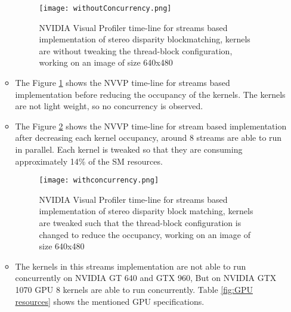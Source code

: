 \begin{itemize}
\begin{itemize}
		\begin{figure}[htb]
			\centering
			\texttt{[image: withoutConcurrency.png]}
			\caption{NVIDIA Visual Profiler time-line for streams based implementation of stereo disparity blockmatching, kernels are without tweaking the thread-block configuration, working on an image of size 640x480}
			\label{fig:full occupancy}
		\end{figure}
		\item The Figure \ref{fig:full occupancy} shows the NVVP time-line for streams based implementation before reducing the occupancy of the kernels. The kernels are not light weight, so no concurrency is observed.
		\item The Figure \ref{fig:reduced occupancy} shows the NVVP time-line for stream based implementation after decreasing each kernel occupancy,  around 8 streams are able to run in parallel. Each kernel is tweaked so that they are consuming approximately 14\% of the SM resources.
		\begin{figure}[htb]
			\centering
			\texttt{[image: withconcurrency.png]}
			\caption{NVIDIA Visual Profiler time-line for streams based implementation of stereo disparity block matching, kernels are tweaked such that the thread-block configuration is changed to reduce the occupancy, working on an image of size 640x480}
			\label{fig:reduced occupancy}
		\end{figure}
		\item The kernels in this streams implementation are not able to run concurrently on NVIDIA GT 640 and GTX 960, But on NVIDIA GTX 1070 GPU 8 kernels are able to run concurrently. Table \ref{fig:GPU resources} shows the mentioned GPU specifications.	
			\begin{table}[htb]
				\centering
				\caption{Hardware resources of different GPUs used for stereo disparity block matching}%
				\label{fig:GPU resources}
			\end{table}
	\end{itemize}
\end{itemize}
